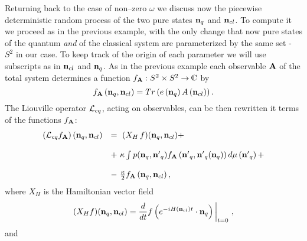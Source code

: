 \documentclass[12pt]{article}
\def\complex{{\kern .1em {\raise .47ex \hbox
{$\scriptscriptstyle
|$}}
\kern -.4em {\rm C}}}
\def\be{\begin{equation}} \def\ee{\end{equation}}
\begin{document}
Returning back to the case of non--zero $\omega$ we discuss now
the piecewise deterministic random process
of the two pure states ${\bf n}_q$ and
${\bf n}_{cl}$.  To compute it we proceed as in the previous example, 
with the
only change that now pure states of the quantum {\sl and} of the classical
system are parameterized by the same set - $S^2$ in our case.  To keep track of
the origin of each parameter we will use subscripts as in ${\bf n}_{cl}$ and
${\bf n}_{q}$.  As in the previous example each observable ${\bf A}$ of the
total
system determines a function $f_{\bf A}: S^2\times S^2\rightarrow\complex$ by
$$f_{\bf A}\left ({\bf n}_q, {\bf n}_{cl}\right)=Tr\left (e\left ({\bf
n}_q\right)A\left ({\bf n}_{cl}\right)\right). $$ 
The Liouville operator  ${\cal L}_{cq}$,  acting on observables,   can be then  
rewritten it terms of the functions  $f_{\bf A}$: 
 \be
 \begin{array}{ll}
\left ({\cal L}_{cq}f_{\bf A}\right)\left ({\bf n}_q, {\bf n}_{cl}\right)
& 
= \   (X_H\,  f) ({\bf n}_q, {\bf n}_{cl})  +
\cr\cr
& + \  \kappa\int p ({\bf n}_q, {\bf n'}_{q}) f_{\bf A}\left ({\bf n'}_{q}, 
{{\bf n'}_{q}} ({\bf n}_{q})\right)d\mu \left ({\bf n'}_{q}\right) +
\cr\cr
& - \ {\kappa\over 2} f_{\bf A}\left ({\bf n}_q, {\bf n}_{cl}\right), 
\end{array}
\ee
where $X_H$ is the Hamiltonian vector field
\be
 (X_H f) ({\bf n}_q, {\bf n}_{cl})={d\over dt}f\left (e^{-iH ({\bf n}_{cl})t}
\cdot {\bf n}_{q}
\right)\bigg\vert_{t=0} \  , 
\ee
and
\end{document}
